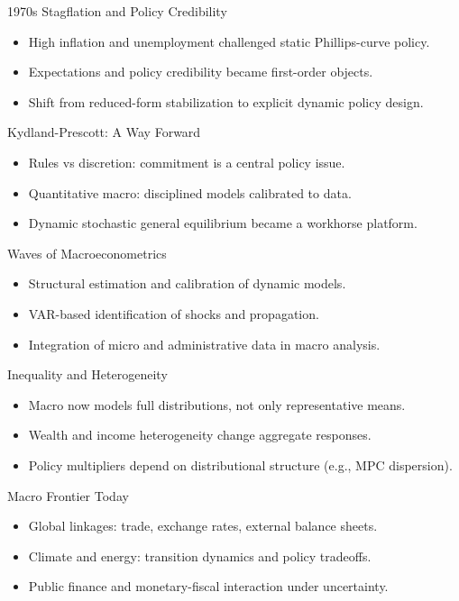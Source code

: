 \documentclass[aspectratio=169,10pt]{beamer}
\begin{document}
\begin{frame}{1970s Stagflation and Policy Credibility}
\begin{itemize}
  \item High inflation and unemployment challenged static Phillips-curve policy.
  \item Expectations and policy credibility became first-order objects.
  \item Shift from reduced-form stabilization to explicit dynamic policy design.
\end{itemize}
\end{frame}

\begin{frame}{Kydland-Prescott: A Way Forward}
\begin{itemize}
  \item Rules vs discretion: commitment is a central policy issue.
  \item Quantitative macro: disciplined models calibrated to data.
  \item Dynamic stochastic general equilibrium became a workhorse platform.
\end{itemize}
\end{frame}

\begin{frame}{Waves of Macroeconometrics}
\begin{itemize}
  \item Structural estimation and calibration of dynamic models.
  \item VAR-based identification of shocks and propagation.
  \item Integration of micro and administrative data in macro analysis.
\end{itemize}
\end{frame}

\begin{frame}{Inequality and Heterogeneity}
\begin{itemize}
  \item Macro now models full distributions, not only representative means.
  \item Wealth and income heterogeneity change aggregate responses.
  \item Policy multipliers depend on distributional structure (e.g., MPC dispersion).
\end{itemize}
\end{frame}

\begin{frame}{Macro Frontier Today}
\begin{itemize}
  \item Global linkages: trade, exchange rates, external balance sheets.
  \item Climate and energy: transition dynamics and policy tradeoffs.
  \item Public finance and monetary-fiscal interaction under uncertainty.
\end{itemize}
\end{frame}
\end{document}
